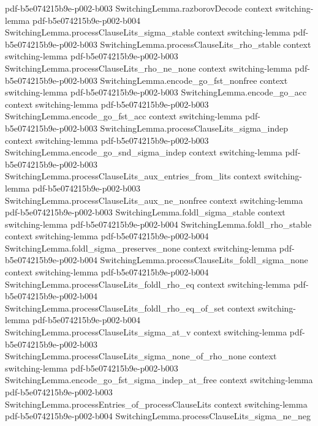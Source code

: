 \begin{lemma}
  {pdf-b5e074215b9e-p002-b003}
\proofstep
  {SwitchingLemma.razborovDecode}
  {context}
  {switching-lemma}
  {pdf-b5e074215b9e-p002-b004}
\proofstep
  {SwitchingLemma.processClauseLits_sigma_stable}
  {context}
  {switching-lemma}
  {pdf-b5e074215b9e-p002-b003}
\proofstep
  {SwitchingLemma.processClauseLits_rho_stable}
  {context}
  {switching-lemma}
  {pdf-b5e074215b9e-p002-b003}
\proofstep
  {SwitchingLemma.processClauseLits_rho_ne_none}
  {context}
  {switching-lemma}
  {pdf-b5e074215b9e-p002-b003}
\proofstep
  {SwitchingLemma.encode_go_fst_nonfree}
  {context}
  {switching-lemma}
  {pdf-b5e074215b9e-p002-b003}
\proofstep
  {SwitchingLemma.encode_go_acc}
  {context}
  {switching-lemma}
  {pdf-b5e074215b9e-p002-b003}
\proofstep
  {SwitchingLemma.encode_go_fst_acc}
  {context}
  {switching-lemma}
  {pdf-b5e074215b9e-p002-b003}
\proofstep
  {SwitchingLemma.processClauseLits_sigma_indep}
  {context}
  {switching-lemma}
  {pdf-b5e074215b9e-p002-b003}
\proofstep
  {SwitchingLemma.encode_go_snd_sigma_indep}
  {context}
  {switching-lemma}
  {pdf-b5e074215b9e-p002-b003}
\proofstep
  {SwitchingLemma.processClauseLits_aux_entries_from_lits}
  {context}
  {switching-lemma}
  {pdf-b5e074215b9e-p002-b003}
\proofstep
  {SwitchingLemma.processClauseLits_aux_ne_nonfree}
  {context}
  {switching-lemma}
  {pdf-b5e074215b9e-p002-b003}
\proofstep
  {SwitchingLemma.foldl_sigma_stable}
  {context}
  {switching-lemma}
  {pdf-b5e074215b9e-p002-b004}
\proofstep
  {SwitchingLemma.foldl_rho_stable}
  {context}
  {switching-lemma}
  {pdf-b5e074215b9e-p002-b004}
\proofstep
  {SwitchingLemma.foldl_sigma_preserves_none}
  {context}
  {switching-lemma}
  {pdf-b5e074215b9e-p002-b004}
\proofstep
  {SwitchingLemma.processClauseLits_foldl_sigma_none}
  {context}
  {switching-lemma}
  {pdf-b5e074215b9e-p002-b004}
\proofstep
  {SwitchingLemma.processClauseLits_foldl_rho_eq}
  {context}
  {switching-lemma}
  {pdf-b5e074215b9e-p002-b004}
\proofstep
  {SwitchingLemma.processClauseLits_foldl_rho_eq_of_set}
  {context}
  {switching-lemma}
  {pdf-b5e074215b9e-p002-b004}
\proofstep
  {SwitchingLemma.processClauseLits_sigma_at_v}
  {context}
  {switching-lemma}
  {pdf-b5e074215b9e-p002-b003}
\proofstep
  {SwitchingLemma.processClauseLits_sigma_none_of_rho_none}
  {context}
  {switching-lemma}
  {pdf-b5e074215b9e-p002-b003}
\proofstep
  {SwitchingLemma.encode_go_fst_sigma_indep_at_free}
  {context}
  {switching-lemma}
  {pdf-b5e074215b9e-p002-b003}
\proofstep
  {SwitchingLemma.processEntries_of_processClauseLits}
  {context}
  {switching-lemma}
  {pdf-b5e074215b9e-p002-b004}
\proofstep
  {SwitchingLemma.processClauseLits_sigma_ne_neg}

\end{lemma}

